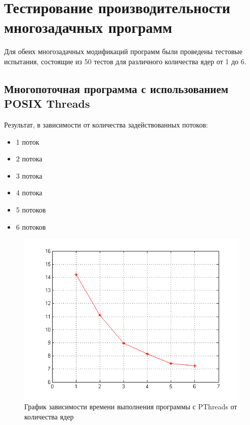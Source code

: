 \section{Тестирование производительности многозадачных программ}

Для обеих многозадачных модификаций программ были проведены тестовые испытания, состоящие из 50 тестов для различного количества ядер от 1 до 6.


\subsection{Многопоточная программа с использованием POSIX Threads}

Результат, в зависимости от количества задействованных потоков:

\begin{itemize}
	\item 1 поток
		
	\item 2 потока
		
	\item 3 потока
		
	\item 4 потока
		
	\item 5 потоков
		
	\item 6 потоков
		
\end{itemize}

\begin{figure}[H]
	\begin{center}
		\includegraphics[scale=0.7]{pic/posix.png}
		\caption{График зависимости времени выполнения программы с PThreads от количества ядер} 
		\label{pic:pic_name} %
	\end{center}
\end{figure}

